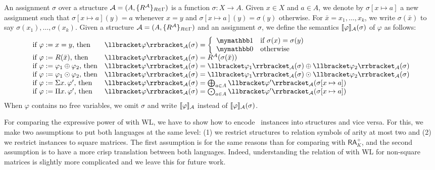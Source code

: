 An assignment $\sigma$ over a structure $\mathcal{A} = (A, \{R^{\mathcal{A}}\}_{R \in \Gamma})$ is a function $\sigma: X \rightarrow A$. Given $x \in X$ and $a \in A$, we denote by $\sigma[x \mapsto a]$ a new assignment such that $\sigma[x \mapsto a](y) = a$ whenever $x = y$ and $\sigma[x \mapsto a](y) = \sigma(y)$ otherwise. For $\bar{x} = x_1, \ldots, x_k$,  we write $\sigma(\bar{x})$ to say $\sigma(x_1),\ldots, \sigma(x_k)$. Given a structure $\mathcal{A} = (A, \{R^{\mathcal{A}}\}_{R \in \Gamma})$ and an assignment $\sigma$, we define the semantics $\llbracket \varphi \rrbracket_{\mathcal{A}}(\sigma)$ of $\varphi$ as follows:
$$
\begin{array}{ll}
\text{if $\varphi := x = y$, then} & \ssem{\varphi}{\cA}(\sigma) = 
\left\{
\begin{array}{ll}
\kone & \text{if $\sigma(x) = \sigma(y)$} \\
\kzero & \text{otherwise}
\end{array}
\right. \\
\text{if $\varphi := R(\bar{x})$, then} & \ssem{\varphi}{\cA}(\sigma) = R^\cA(\sigma(\bar{x})) \\
\text{if $\varphi := \varphi_1 \ksum \varphi_2$, then} & \ssem{\varphi}{\cA}(\sigma) = \ssem{\varphi_1}{\cA}(\sigma) \ksum \ssem{\varphi_2}{\cA}(\sigma)  \\
\text{if $\varphi := \varphi_1 \kprod \varphi_2$, then} & \ssem{\varphi}{\cA}(\sigma) = \ssem{\varphi_1}{\cA}(\sigma) \kprod \ssem{\varphi_2}{\cA}(\sigma)  \\
\text{if $\varphi := \Sigma x. \, \varphi'$, then} & \ssem{\varphi}{\cA}(\sigma) =  \bigksum_{a \in A} \ssem{\varphi'}{\cA}(\sigma[x \mapsto a]) \\
\text{if $\varphi := \Pi x. \, \varphi'$, then} & \ssem{\varphi}{\cA}(\sigma) =  \bigkprod_{a \in A} \ssem{\varphi'}{\cA}(\sigma[x \mapsto a])
\end{array}
$$
When $\varphi$ contains no free variables, we omit $\sigma$ and write $\llbracket \varphi \rrbracket_{\mathcal{A}}$ instead of $\llbracket \varphi \rrbracket_{\mathcal{A}}(\sigma)$.

For comparing the expressive power of \langprod with WL, we have to show how to encode \lang\ instances into structures and vice versa. For this, we make two assumptions to put both languages at the same level: (1) we restrict structures to relation symbols of arity at most two and (2) we restrict instances to square matrices. The first assumption is for the same reasons than for comparing \langsum with $\mathsf{RA}_K^+$, and the second assumption is to have a more crisp translation between both languages. Indeed, understanding the relation of \langprod with WL for non-square matrices is slightly more complicated and we leave this for future work. 

